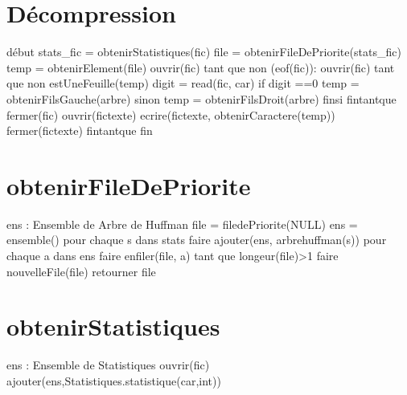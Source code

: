 \documentclass{article}
\begin{document}
\section{Décompression}

\begin{algorithme}
    \newLine
    {}
début
    stats_fic = obtenirStatistiques(fic)
    file = obtenirFileDePriorite(stats_fic)
    temp = obtenirElement(file)
    ouvrir(fic)
    tant que non (eof(fic)):
        ouvrir(fic)
        tant que non estUneFeuille(temp)    
            digit = read(fic, car)
            if digit ==0
                temp = obtenirFilsGauche(arbre)
            sinon 
                temp = obtenirFilsDroit(arbre)
            finsi
        fintantque
        fermer(fic)
        ouvrir(fictexte)
        ecrire(fictexte, obtenirCaractere(temp))  
        fermer(fictexte)  
    fintantque
fin



\end{algorithme}

\section{obtenirFileDePriorite}

\begin{algorithme}
    {}
    {ens : Ensemble de Arbre de Huffman}
    {
        file = filedePriorite(NULL)
        ens = ensemble()
        pour chaque s dans stats faire
            ajouter(ens, arbrehuffman(s))
        pour chaque a dans ens faire
            enfiler(file, a)
        tant que longeur(file)>1 faire
            nouvelleFile(file)
        retourner file
    }
\end{algorithme}

\section{obtenirStatistiques}

\begin{algorithme}
    {}
    {ens : Ensemble de Statistiques}
    {ouvrir(fic)
        {
        ajouter(ens,Statistiques.statistique(car,int))}
    }
\end{algorithme}
\end{document}
